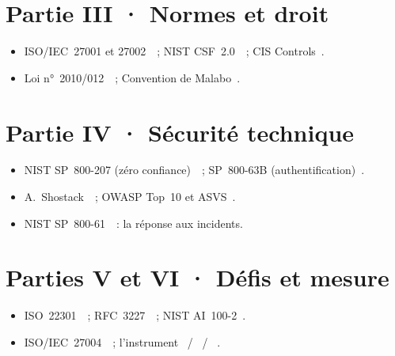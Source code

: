 \section*{Partie III · Normes et droit}
\begin{itemize}
    \item ISO/IEC~27001 et 27002~\cite{iso27001_2022,iso27002_2022}~; NIST CSF~2.0~\cite{nist2024csf}~; CIS Controls~\cite{cis2021controls}.
    \item Loi n°~2010/012~\cite{loi2010012}~; Convention de Malabo~\cite{malabo2014}.
\end{itemize}

\section*{Partie IV · Sécurité technique}
\begin{itemize}
    \item NIST SP~800-207 (zéro confiance)~\cite{nist800207}~; SP~800-63B (authentification)~\cite{nist80063b}.
    \item A.~Shostack~\cite{shostack2014}~; OWASP Top~10 et ASVS~\cite{owasp2021top10,owasp2021asvs}.
    \item NIST SP~800-61~\cite{nist80061r2,nist80061r3}~: la réponse aux incidents.
\end{itemize}

\section*{Parties V et VI · Défis et mesure}
\begin{itemize}
    \item ISO~22301~\cite{iso22301_2019}~; RFC~3227~\cite{rfc3227}~; NIST AI~100-2~\cite{nist2023aml}.
    \item ISO/IEC~27004~\cite{iso27004_2016}~; l'instrument \OUI{}~/ \NON{}~/ \NEK{}~\cite{minka2026nek}.
\end{itemize}

